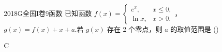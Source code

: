 
\begin{problem}{2018}{G}{全国I卷}{9}{函数}
已知函数 $ f(x)=\begin{cases} e^x, & x\leqslant 0, \\ \ln x, & x>0. \end{cases} $，$ g(x)=f(x)+x+a $.若 $ g(x) $ 存在 2 个零点，则 $ a $ 的取值范围是 (\hspace{1cm})
\begin{choices}
\choice{{${[-1,0)}$}}
\choice{{${[0,+\infty)}$}}
\choice{{${[-1,+\infty)}$}}
\choice{{${[1,+\infty)}$}}
\end{choices}
\end{problem}

\begin{answer}
C
\end{answer}

